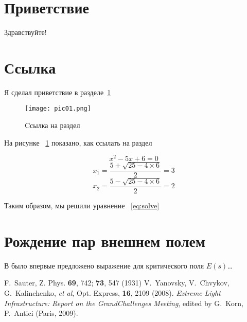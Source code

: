 \documentclass[a4paper,11pt]{article}
\begin{document}
\section{ Приветствие}
\label{sec:greetings}
Здравствуйте!
\section{Ссылка}
Я сделал приветствие в разделе~\ref{sec:greetings}
\begin{figure}[!h]
	\centering
		\texttt{[image: pic01.png]}
	\caption{Cсылка на раздел}
	\label{fig:ref}
\end{figure}
На рисунке ~\ref{fig:ref} показано, как ссылать на раздел

\begin{equation}
\label {eq:solve}
x^2 - 5 x + 6 = 0
\end{equation}
\begin{equation}
x_1 = \frac{5 + \sqrt{25 - 4 \times 6}}{2} = 3
\end{equation}
\begin{equation}
x_2 = \frac{5 - \sqrt{25 - 4 \times 6}}{2} = 2
\end{equation}

Таким образом, мы решили уравнение ~\eqref{eq:solve}

\section{Рождение пар внешнем полем}
В \cite{Sauter} было впервые предложено выражение для критического поля $E(s)$\ldots

\begin{thebibliography}{99}
 F.~Sauter, Z. Phys. \textbf{69}, 742; \textbf{73}, 547 (1931)
 V.~Yanovsky, V.~Chvykov, G.~Kalinchenko, \textit{et al}, Opt. Express, \textbf{16}, 2109 (2008).
 \textit{Extreme Light Infrastructure: Report on the GrandChallenges Meeting}, edited by G.~Korn, P.~Antici (Paris, 2009).
\end{thebibliography}
\end{document}
